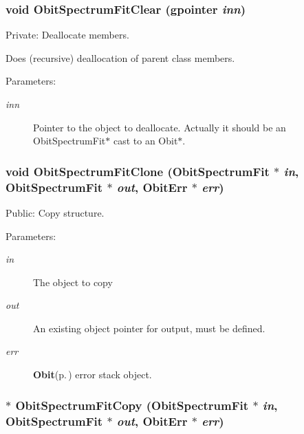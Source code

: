 \subsubsection{\setlength{\rightskip}{0pt plus 5cm}void Obit\-Spectrum\-Fit\-Clear (gpointer {\em inn})}\label{ObitSpectrumFit_8c_a4}


Private: Deallocate members. 

Does (recursive) deallocation of parent class members. \begin{Desc}
\item[Parameters:]
\begin{description}
\item[{\em inn}]Pointer to the object to deallocate. Actually it should be an Obit\-Spectrum\-Fit$\ast$ cast to an Obit$\ast$. \end{description}
\end{Desc}
\subsubsection{\setlength{\rightskip}{0pt plus 5cm}void Obit\-Spectrum\-Fit\-Clone ({\bf Obit\-Spectrum\-Fit} $\ast$ {\em in}, {\bf Obit\-Spectrum\-Fit} $\ast$ {\em out}, {\bf Obit\-Err} $\ast$ {\em err})}\label{ObitSpectrumFit_8c_a14}


Public: Copy structure. 

\begin{Desc}
\item[Parameters:]
\begin{description}
\item[{\em in}]The object to copy \item[{\em out}]An existing object pointer for output, must be defined. \item[{\em err}]{\bf Obit}{\rm (p.\,\pageref{structObit})} error stack object. \end{description}
\end{Desc}
\subsubsection{$\ast$ Obit\-Spectrum\-Fit\-Copy ({\bf Obit\-Spectrum\-Fit} $\ast$ {\em in}, {\bf Obit\-Spectrum\-Fit} $\ast$ {\em out}, {\bf Obit\-Err} $\ast$ {\em err})}\label{ObitSpectrumFit_8c_a13}



